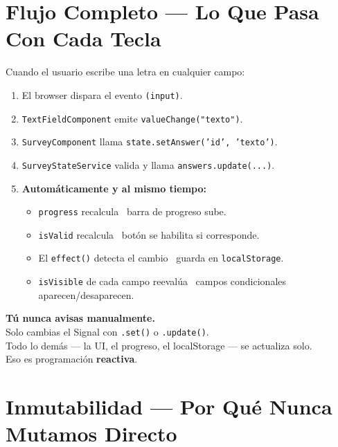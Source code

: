 \documentclass[12pt, a4paper]{article}
\begin{document}
\section{ Flujo Completo — Lo Que Pasa Con Cada Tecla}

Cuando el usuario escribe una letra en cualquier campo:

\begin{enumerate}
  \item {} El browser dispara el evento \texttt{(input)}.
  \item {} \texttt{TextFieldComponent} emite \texttt{valueChange("texto")}.
  \item {} \texttt{SurveyComponent} llama \texttt{state.setAnswer('id', 'texto')}.
  \item {} \texttt{SurveyStateService} valida y llama \texttt{answers.update(...)}.
  \item \textbf{Automáticamente y al mismo tiempo:}
  \begin{itemize}
    \item {} \texttt{progress} recalcula \textrightarrow\ barra de progreso sube.
    \item {} \texttt{isValid} recalcula \textrightarrow\ botón se habilita si corresponde.
    \item {} El \texttt{effect()} detecta el cambio \textrightarrow\ guarda en \texttt{localStorage}.
    \item {} \texttt{isVisible} de cada campo reevalúa \textrightarrow\ campos condicionales aparecen/desaparecen.
  \end{itemize}
\end{enumerate}

\begin{tcolorbox}[regla, title={\emoji{star} El Principio Más Importante}]
  \textbf{Tú nunca avisas manualmente.}\\[0.2cm]
  Solo cambias el Signal con \texttt{.set()} o \texttt{.update()}.\\
  Todo lo demás — la UI, el progreso, el localStorage — se actualiza solo.\\[0.2cm]
  Eso es programación \textbf{reactiva}.
\end{tcolorbox}

\section{ Inmutabilidad — Por Qué Nunca Mutamos Directo}
\end{document}
